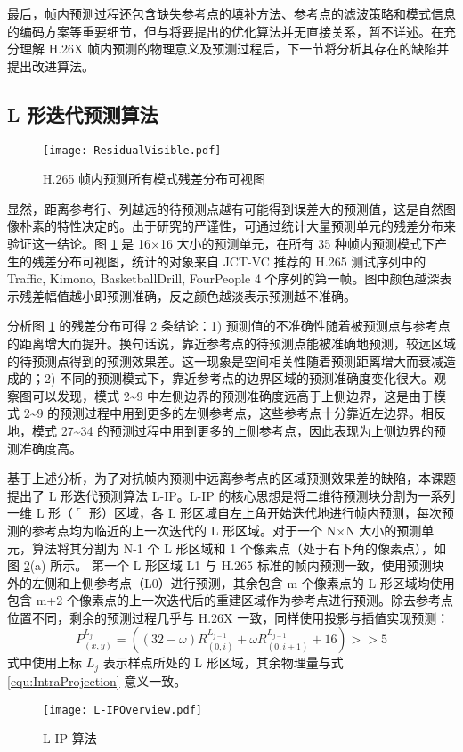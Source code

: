 最后，帧内预测过程还包含缺失参考点的填补方法、参考点的滤波策略和模式信息的编码方案等重要细节，但与将要提出的优化算法并无直接关系，暂不详述。在充分理解 H.26X 帧内预测的物理意义及预测过程后，下一节将分析其存在的缺陷并提出改进算法。

\subsection{L 形迭代预测算法}
\label{cha:L-IPOverview}
\begin{figure}[hbt]
    \centering
    \texttt{[image: ResidualVisible.pdf]}
    \caption{H.265 帧内预测所有模式残差分布可视图}
    \label{fig:ResidualVisible}
\end{figure}
显然，距离参考行、列越远的待预测点越有可能得到误差大的预测值，这是自然图像朴素的特性决定的。出于研究的严谨性，可通过统计大量预测单元的残差分布来验证这一结论。图 \ref{fig:ResidualVisible} 是 16$\times$16 大小的预测单元，在所有 35 种帧内预测模式下产生的残差分布可视图，统计的对象来自 JCT-VC 推荐的 H.265 测试序列中的 Traffic, Kimono, BasketballDrill, FourPeople 4 个序列的第一帧。图中颜色越深表示残差幅值越小即预测准确，反之颜色越淡表示预测越不准确。

分析图 \ref{fig:ResidualVisible} 的残差分布可得 2 条结论：1) 预测值的不准确性随着被预测点与参考点的距离增大而提升。换句话说，靠近参考点的待预测点能被准确地预测，较远区域的待预测点得到的预测效果差。这一现象是空间相关性随着预测距离增大而衰减造成的；2) 不同的预测模式下，靠近参考点的边界区域的预测准确度变化很大。观察图可以发现，模式 2\textasciitilde9 中左侧边界的预测准确度远高于上侧边界，这是由于模式 2\textasciitilde9 的预测过程中用到更多的左侧参考点，这些参考点十分靠近左边界。相反地，模式 27\textasciitilde34 的预测过程中用到更多的上侧参考点，因此表现为上侧边界的预测准确度高。

基于上述分析，为了对抗帧内预测中远离参考点的区域预测效果差的缺陷，本课题提出了 L 形迭代预测算法 L-IP。L-IP 的核心思想是将二维待预测块分割为一系列一维 L 形（$\ulcorner$ 形）区域，各 L 形区域自左上角开始迭代地进行帧内预测，每次预测的参考点均为临近的上一次迭代的 L 形区域。对于一个 N$\times$N 大小的预测单元，算法将其分割为 N-1 个 L 形区域和 1 个像素点（处于右下角的像素点），如图 \ref{fig:L-IPOverview}(a) 所示。
第一个 L 形区域 L1 与 H.265 标准的帧内预测一致，使用预测块外的左侧和上侧参考点（L0）进行预测，其余包含 m 个像素点的 L 形区域均使用包含 m+2 个像素点的上一次迭代后的重建区域作为参考点进行预测。除去参考点位置不同，剩余的预测过程几乎与 H.26X 一致，同样使用投影与插值实现预测：
\begin{equation}
    P_{(x,y)}^{L_j} =((32-\omega)R_{(0,i)}^{L_{j-1}} +\omega R_{(0,i+1)}^{L_{j-1}} +16)>>5
    \label{equ:L-IP}
\end{equation}
式中使用上标 $L_j$ 表示样点所处的 L 形区域，其余物理量与式 \ref{equ:IntraProjection} 意义一致。
\begin{figure}[hbt]
    \centering
    \texttt{[image: L-IPOverview.pdf]}
    \caption{L-IP 算法}
    \label{fig:L-IPOverview}
\end{figure}

